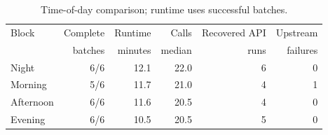 \begin{table}[!ht]
\centering
\caption{Time-of-day comparison; runtime uses successful batches.}
\label{tab:gemini-free-tier-blocks}
\scriptsize
\setlength{\tabcolsep}{3.2pt}
\begin{tabular}{@{}lrrrrr@{}}
\toprule
Block & Complete & Runtime & Calls & Recovered API & Upstream \\
 & batches & minutes & median & runs & failures \\
\midrule
Night & 6/6 & 12.1 & 22.0 & 6 & 0 \\
Morning & 5/6 & 11.7 & 21.0 & 4 & 1 \\
Afternoon & 6/6 & 11.6 & 20.5 & 4 & 0 \\
Evening & 6/6 & 10.5 & 20.5 & 5 & 0 \\
\bottomrule
\end{tabular}
\end{table}
